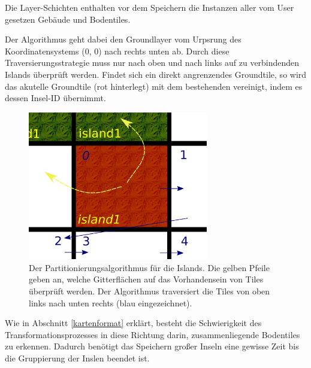 Die Layer-Schichten enthalten vor dem Speichern die Instanzen aller vom User
gesetzen Gebäude und Bodentiles.

Der Algorithmus geht dabei den Groundlayer vom Urpsrung des Koordinatensystems
(0, 0) nach rechts unten ab. Durch diese Traversierungsstrategie muss nur
nach oben und nach links auf zu verbindenden Islands überprüft werden. Findet
sich ein direkt angrenzendes Groundtile, so wird das akutelle Groundtile (rot
hinterlegt) mit dem bestehenden vereinigt, indem es dessen Insel-ID übernimmt.

%
%
\begin{figure}[htbp]
  \centering

    \includegraphics[width=0.7\textwidth]{gfx/merge_algorithm.png}

  \caption{Der Partitionierungsalgorithmus für die Islands. Die gelben Pfeile
  geben an, welche Gitterflächen auf das Vorhandensein von Tiles überprüft
  werden. Der Algorithmus traversiert die Tiles von oben links nach unten
  rechts (blau eingezeichnet).}
  \label{figure:automaton-intersection}
\end{figure}

Wie in Abschnitt \ref{kartenformat} erklärt, besteht die Schwierigkeit des
Transformationsprozesses in diese Richtung darin, zusammenliegende Bodentiles zu
erkennen. Dadurch benötigt das Speichern großer Inseln eine gewisse Zeit bis die
Gruppierung der Inslen beendet ist.
